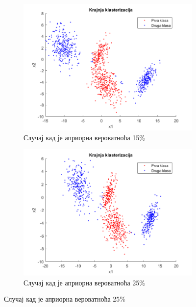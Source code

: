 \begin{figure}[htb!]\caption{Крајња кластеризација}
\begin{subfigure}{.6\textwidth}
\centering
\includegraphics[width=1\textwidth]{pictures/4/QuadrFinal15}
\caption{Случај кад је априорна вероватноћа 15\%}\label{pic:Quad15Final}
\end{subfigure}
\begin{subfigure}{.55\textwidth}
\centering
\includegraphics[width=1\linewidth]{pictures/4/QuadrFinal25}
\caption{Случај кад је априорна вероватноћа 25\%}\label{pic:Quad20Final}
\end{subfigure}

\end{figure}


